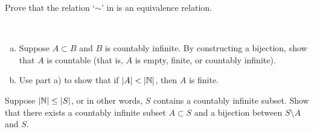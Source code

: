 \begin{exercise}
Prove that the relation `$\sim$'
in  is an equivalence
relation.
\end{exercise}

\begin{exercise}
{\ }
\begin{enumerate}[a)]
\item
Suppose $A \subset B$ and $B$ is countably infinite.  By constructing a
bijection, show that $A$ is
countable (that is, $A$ is empty, finite, or countably infinite).
\item 
Use part a) to show that if $\left\lvert {A} \right\rvert < \left\lvert {{\mathbb{N}}} \right\rvert$, then $A$ is finite.
\end{enumerate}
\end{exercise}

\begin{exercise}[Challenging] \label{exercise:countsubsetbij}
Suppose $\left\lvert {{\mathbb{N}}} \right\rvert \leq \left\lvert {S} \right\rvert$, or in other words, $S$
contains a countably infinite subset.
Show that there exists a countably infinite subset $A \subset S$ and
a bijection between $S \setminus A$ and $S$.
\end{exercise}
